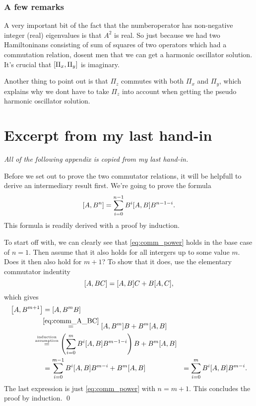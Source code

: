 \documentclass[11pt,letter, swedish, english
]{article}
\begin{document}

\subsubsection*{A few remarks}
A very important bit of the fact that the numberoperator has
non-negative integer (real) eigenvalues is that $A^2$ is real. So just
because we had two Hamiltoninans consisting of sum of squares of two
operators which had a commutation relation, dosent men that we can get
a harmonic oscillator solution. It's crucial that
$\comm{\Pi_x}{\Pi_y}$ is imaginary. 

Another thing to point out is that $\Pi_z$ commutes with both $\Pi_x$
and $\Pi_y$, which explains why we dont have to take $\Pi_z$ into
account when getting the pseudo harmonic oscillator solution. 



\newpage
\appendix


\section{Excerpt from my last hand-in}\label{sec:comm}
\textit{All of the following appendix is copied from my last hand-in.}

Before we set out to prove the two commutator relations, it will be
helpfull to derive an intermediary result first. We're going to prove
the formula
\begin{equation} \label{eq:comm_power}
\comm{A}{B^n} = \sum_{i=0}^{n-1} B^{i}\comm{A}{B}B^{n-1-i}.
\end{equation}
This formula is readily derived with a proof by induction. 

To start off with, we can clearly see that \eqref{eq:comm_power} holds
in the base case of $n=1$. Then assume that it also holds for all
intergers up to some value $m$. Does it then also hold for $m+1$?
To show that it does, use the elementary commutator
indentity
\begin{equation} \label{eq:comm_A_BC}
\comm{A}{BC} = \comm{A}{B}C+B\comm{A}{C},
\end{equation}
which gives
\begin{equation}
\begin{aligned}
\comm{A}{B^{m+1}} &= \comm{A}{B^{m}B} \\
&\hspace{-3pt}\stackrel{\eqref{eq:comm_A_BC}}{=} \comm{A}{B^{m}}B + B^m\comm{A}{B}\\
&\hspace{-14pt}\stackrel{\stackrel{\text{\tiny induction}}{\text{\tiny assumption}}}{=}
\left(\sum_{i=0}^{m} B^{i}\comm{A}{B}B^{m-1-i}\right) B + B^m\comm{A}{B}\\
&=\sum_{i=0}^{m-1} B^{i}\comm{A}{B}B^{m-i} + B^m\comm{A}{B}&=\sum_{i=0}^{m} B^{i}\comm{A}{B}B^{m-i}.
\end{aligned}
\end{equation}
The last expression is just \eqref{eq:comm_power} with $n=m+1$. This
concludes the proof by induction. \qed
\end{document}
